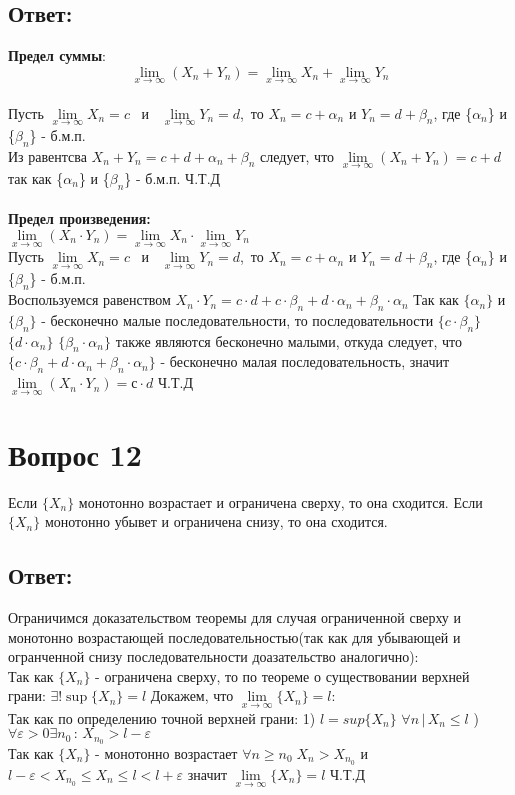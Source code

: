 \documentclass{article}
\begin{document}
\subsection*{Ответ:}
\textbf{Предел суммы}:\\
$$\lim\limits_{x\to \infty} (X_n + Y_n) =
\lim\limits_{x\to \infty} X_n + \lim\limits_{x\to \infty} Y_n$$
\\
Пусть $\lim\limits_{x\to \infty} X_n = c$ \, и \, $\lim\limits_{x\to \infty} Y_n = d$,\, то $X_n = c + \alpha_n$ и $Y_n = d + \beta_n$, где \{$\alpha_n$\} и \{$\beta_n$\} - б.м.п.\\ Из равентсва $X_n + Y_n =c + d + \alpha_n + \beta_n $ следует, что $\lim\limits_{x\to \infty} (X_n + Y_n) = c + d$ так как \{$\alpha_n$\} и \{$\beta_n$\} - б.м.п.
Ч.Т.Д \\
\\
\textbf{Предел произведения:}\\
$\lim\limits_{x\to \infty} (X_n \cdot Y_n) =
\lim\limits_{x\to \infty} X_n \cdot \lim\limits_{x\to \infty} Y_n$
\\
Пусть $\lim\limits_{x\to \infty} X_n = c$ \, и \, $\lim\limits_{x\to \infty} Y_n = d$,\, то $X_n = c + \alpha_n$ и $Y_n = d + \beta_n$, где \{$\alpha_n$\} и \{$\beta_n$\} - б.м.п.\\ Воспользуемся равенством $X_n \cdot Y_n = c\cdot d + c\cdot\beta_n + d\cdot\alpha_n + \beta_n \cdot \alpha_n $
Так как $\{\alpha_n\}$ и $\{\beta_n\}$ - бесконечно малые последовательности, то последовательности $\{c\cdot\beta_n\}$ $\{d\cdot\alpha_n\}$ $\{\beta_n \cdot \alpha_n\}$ также являются бесконечно малыми, откуда следует, что $\{c\cdot\beta_n + d\cdot\alpha_n + \beta_n \cdot \alpha_n\}$ - бесконечно малая последовательность, значит $\lim\limits_{x\to \infty} (X_n \cdot Y_n) = с \cdot d$ Ч.Т.Д
\section*{Вопрос 12}
\begin{center}
Если $\{X_n\}$ монотонно возрастает и ограничена сверху, то она сходится.
Если $\{X_n\}$ монотонно убывет и ограничена снизу, то она сходится.
\end{center}
\subsection*{Ответ:}
Ограничимся доказательством теоремы для случая ограниченной сверху и монотонно возрастающей последовательностью(так как для убывающей и огранченной снизу последовательности доазательство аналогично):\\
Так как $\{X_n\}$ - ограничена сверху, то по теореме о существовании верхней грани: $\exists! \sup\{X_n\} = l$ Докажем, что $\lim\limits_{x\to \infty} \{X_n\} = l $:\\
Так как по определению точной верхней грани: 1) $l = sup\{X_n\}$ $\forall n \, | \, X_n\leq l$ ) $\forall \varepsilon > 0 \exists n_{0} \, : \, X_{n_{0}} > l - \varepsilon $ \\
Так как $\{X_n\}$ - монотонно возрастает $\forall n \geq n_0 \; X_n > X_{n_0}$\: и \:
$l - \varepsilon < X_{n_0} \leq X_n \leq l < l + \varepsilon$ значит $\lim\limits_{x\to \infty} \{X_n\} = l $ Ч.Т.Д
\newpage
\end{document}
